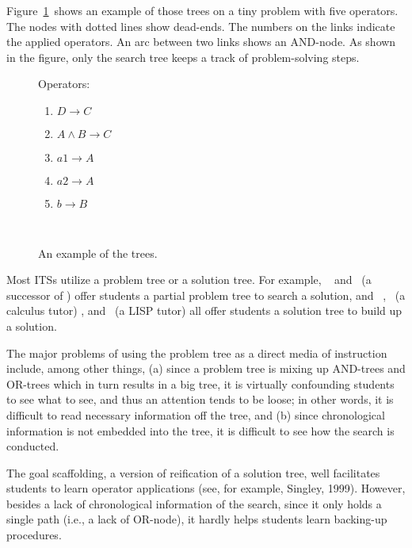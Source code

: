 Figure~\ref{fig:tree}~shows an example of those trees on a tiny problem
with five operators.  The nodes with dotted lines show dead-ends.  The
numbers on the links indicate the applied operators.  An arc between
two links shows an AND-node.  As shown in the figure, only the search
tree keeps a track of problem-solving steps.  

\begin{figure}[tb]
 \center
 \begin{minipage}[b]{.25\textwidth}
  Operators: 
  \begin{enumerate}
   \item $D \rightarrow C$
   \item $A \wedge B \rightarrow C$
   \item $a1 \rightarrow A$
   \item $a2 \rightarrow A$
   \item $b \rightarrow B$
  \end{enumerate}
 \end{minipage}
 \ \ 
 \begin{minipage}[t]{.55\textwidth}
 \end{minipage}
 \caption{An example of the trees.}
 \label{fig:tree}
\end{figure}

Most ITSs utilize a problem tree or a solution tree.  For example,
\GeometryTutor\ \cite{Anderson85} and \Angle\ (a successor of
\GeometryTutor) \cite{Koedinger93} offer students a partial problem tree
to search a solution, and \AlgebraTutor\ \cite{Anderson90},
\RelatedRatesTutor\ (a calculus tutor) \cite{Singley90}, and \Gil\ (a
LISP tutor) \cite{Merrill94} all offer students a solution tree to build
up a solution.

The major problems of using the problem tree as a direct media of
instruction include, among other things, (a) since a problem tree is
mixing up AND-trees and OR-trees which in turn results in a big tree, it
is virtually confounding students to see what to see, and thus an
attention tends to be loose; in other words, it is difficult to read
necessary information off the tree, and (b) since chronological
information is not embedded into the tree, it is difficult to see how
the search is conducted.

The goal scaffolding, a version of reification of a solution tree, well
facilitates students to learn operator applications (see, for example,
Singley, 1999).  However, besides a lack of chronological information of
the search, since it only holds a single path (i.e., a lack of OR-node),
it hardly helps students learn backing-up procedures.  

